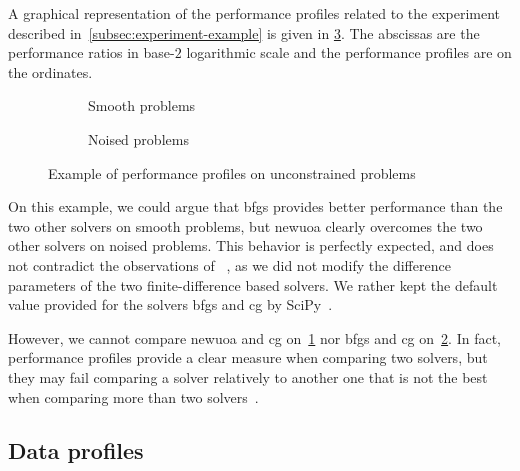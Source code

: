 A graphical representation of the performance profiles related to the experiment described in~\cref{subsec:experiment-example} is given in \cref{fig:performance-profile-example}.
The abscissas are the performance ratios in base-$2$ logarithmic scale and the performance profiles are on the ordinates.

\begin{figure}[ht]
    \centering
    \begin{subfigure}[b]{0.46\textwidth}
        \centering
        \caption{Smooth problems}
        \label{fig:performance-profile-example-smooth}
    \end{subfigure}
    \hfill
    \begin{subfigure}[b]{0.46\textwidth}
        \centering
        \caption{Noised problems}
        \label{fig:performance-profile-example-noised}
    \end{subfigure}
    \caption{Example of performance profiles on unconstrained problems}
    \label{fig:performance-profile-example}
\end{figure}

On this example, we could argue that \gls{bfgs} provides better performance than the two other solvers on smooth problems, but \gls{newuoa} clearly overcomes the two other solvers on noised problems.
This behavior is perfectly expected, and does not contradict the observations of \citeauthor{Shi_Etal_2021}~\cite{Shi_Etal_2021}, as we did not modify the difference parameters of the two finite-difference based solvers.
We rather kept the default value provided for the solvers \gls{bfgs} and \gls{cg} by SciPy~\cite{Virtanen_Etal_2020}.

However, we cannot compare \gls{newuoa} and \gls{cg} on~\cref{fig:performance-profile-example-smooth} nor \gls{bfgs} and \gls{cg} on~\cref{fig:performance-profile-example-noised}.
In fact, performance profiles provide a clear measure when comparing two solvers, but they may fail comparing a solver relatively to another one that is not the best when comparing more than two solvers~\cite{Gould_Scott_2016}.

\subsection{Data profiles}

